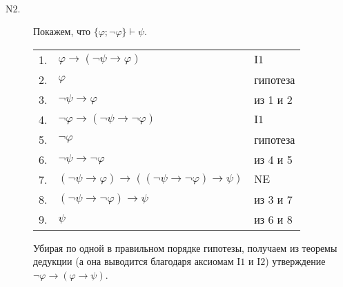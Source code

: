 \documentclass[12pt,a4paper]{article}
\begin{document}
    \begin{enumproblem}\ 
        \begin{description}
            \item[$\mathrm{N2}$.] Покажем, что $\{\varphi; \neg \varphi\} \vdash \psi$.
                \begin{center}
                    \begin{tabular}{rll}
                        1.& $\varphi \rightarrow (\neg \psi \rightarrow \varphi)$& $\mathrm{I1}$\\
                        2.& $\varphi$& гипотеза\\
                        3.& $\neg \psi \rightarrow \varphi$& из 1 и 2\\
                        4.& $\neg \varphi \rightarrow (\neg \psi \rightarrow \neg \varphi)$& $\mathrm{I1}$\\
                        5.& $\neg \varphi$& гипотеза\\
                        6.& $\neg \psi \rightarrow \neg \varphi$& из 4 и 5\\
                        7.& $(\neg \psi \rightarrow \varphi) \rightarrow ((\neg \psi \rightarrow \neg \varphi) \rightarrow \psi)$& $\mathrm{NE}$\\
                        8.& $(\neg \psi \rightarrow \neg \varphi) \rightarrow \psi$& из 3 и 7\\
                        9.& $\psi$& из 6 и 8\\
                    \end{tabular}
                \end{center}
                Убирая по одной в правильном порядке гипотезы, получаем из теоремы дедукции (а она выводится благодаря аксиомам $\mathrm{I1}$ и $\mathrm{I2}$) утверждение $\neg \varphi \rightarrow (\varphi \rightarrow \psi)$.
            

\end{description}
\end{enumproblem}
\end{document}
